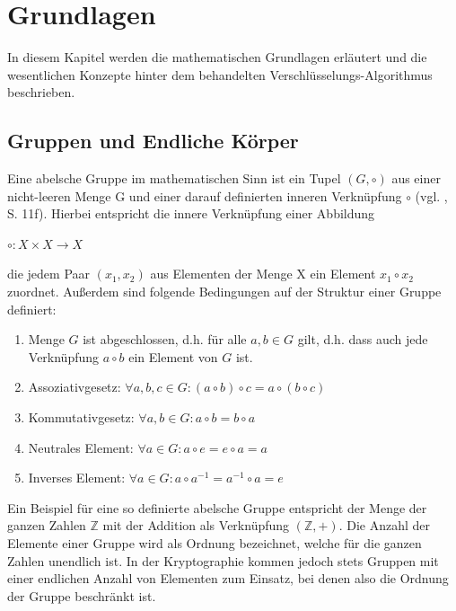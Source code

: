 
\chapter{Grundlagen} \label{sec:basics}

In diesem Kapitel werden die mathematischen Grundlagen erläutert und die wesentlichen Konzepte hinter dem behandelten Verschlüsselungs-Algorithmus beschrieben. \\

\section{Gruppen und Endliche Körper}

Eine abelsche Gruppe im mathematischen Sinn ist ein Tupel $(G,\circ)$ aus einer nicht-leeren Menge G und einer darauf definierten inneren Verknüpfung $\circ$ (vgl. \cite{puttmann}, S. 11f). Hierbei entspricht die innere Verknüpfung einer Abbildung 
\begin{center}
$ \circ: X \times X \to X $
\end{center}
die jedem Paar $(x_1,x_2)$ aus Elementen der Menge X ein Element $x_1 \circ x_2$ zuordnet. Außerdem sind folgende Bedingungen auf der Struktur einer Gruppe definiert: \\

\begin{enumerate}
  \item Menge $G$ ist abgeschlossen, d.h. für alle $a,b \in G$ gilt, d.h. dass auch jede Verknüpfung $a \circ b$ ein Element von $G$ ist. 
  \item Assoziativgesetz: $ \forall a,b,c \in G: (a \circ b) \circ c = a \circ (b \circ c) $
  \item Kommutativgesetz: $ \forall a,b \in G: a \circ b = b \circ a $
  \item Neutrales Element: $ \forall a \in G: a \circ e = e \circ a = a$
  \item Inverses Element: $ \forall a \in G: a \circ a^{-1} = a^{-1} \circ a = e$\\
\end{enumerate}

Ein Beispiel für eine so definierte abelsche Gruppe entspricht der Menge der ganzen Zahlen $\mathbb{Z}$ mit der Addition als Verknüpfung $(\mathbb{Z},+)$. Die Anzahl der Elemente einer Gruppe wird als Ordnung bezeichnet, welche für die ganzen Zahlen unendlich ist. In der Kryptographie kommen jedoch stets Gruppen mit einer endlichen Anzahl von Elementen zum Einsatz, bei denen also die Ordnung der Gruppe beschränkt ist. \\

